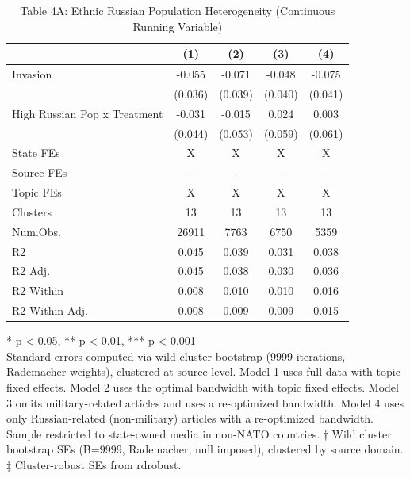 \begin{table}[!t]
\caption{Table 4A: Ethnic Russian Population Heterogeneity (Continuous Running Variable)} 
\fontsize{12.0pt}{14.4pt}\selectfont
\begin{tabular*}{\linewidth}{@{\extracolsep{\fill}}lcccc}
\toprule
  & (1) & (2) & (3) & (4) \\ 
\midrule\addlinespace[2.5pt]
Invasion & -0.055 & -0.071 & -0.048 & -0.075 \\ 
 & (0.036) & (0.039) & (0.040) & (0.041) \\ 
High Russian Pop x Treatment & -0.031 & -0.015 & 0.024 & 0.003 \\ 
{} & {(0.044)} & {(0.053)} & {(0.059)} & {(0.061)} \\ 
State FEs & X & X & X & X \\ 
Source FEs & - & - & - & - \\ 
Topic FEs & X & X & X & X \\ 
Clusters & 13 & 13 & 13 & 13 \\ 
Num.Obs. & 26911 & 7763 & 6750 & 5359 \\ 
R2 & 0.045 & 0.039 & 0.031 & 0.038 \\ 
R2 Adj. & 0.045 & 0.038 & 0.030 & 0.036 \\ 
R2 Within & 0.008 & 0.010 & 0.010 & 0.016 \\ 
R2 Within Adj. & 0.008 & 0.009 & 0.009 & 0.015 \\ 
\bottomrule
\end{tabular*}
\begin{minipage}{\linewidth}
* p < 0.05, ** p < 0.01, *** p < 0.001\\
Standard errors computed via wild cluster bootstrap (9999 iterations, Rademacher
weights), clustered at source level. Model 1 uses full data with topic fixed
effects. Model 2 uses the optimal bandwidth with topic fixed effects. Model 3
omits military-related articles and uses a re-optimized bandwidth. Model 4 uses
only Russian-related (non-military) articles with a re-optimized bandwidth.
Sample restricted to state-owned media in non-NATO countries. † Wild cluster
bootstrap SEs (B=9999, Rademacher, null imposed), clustered by source domain. ‡
Cluster-robust SEs from rdrobust.\\
\end{minipage}
\end{table}

